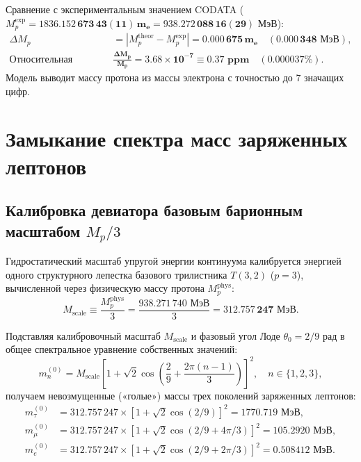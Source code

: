 \documentclass[12pt,a4paper]{article}
\begin{document}
	Сравнение с экспериментальным значением CODATA ($M_p^{\text{exp}} = \mathbf{1836.152\,673\,43(11) \, m_e} = \mathbf{938.272\,088\,16(29) \text{ МэВ}}$):
	\begin{align}
		\Delta M_p &= |M_p^{\text{theor}} - M_p^{\text{exp}}| = \mathbf{0.000\,675 \, m_e} \quad (\mathbf{0.000\,348 \text{ МэВ}}), \\
		\text{Относительная погрешность: } &\mathbf{\frac{\Delta M_p}{M_p} = 3.68 \times 10^{-7} \equiv 0.37 \text{ ppm}} \quad (\mathbf{0.000037\%}).
	\end{align}
	Модель выводит массу протона из массы электрона с точностью до 7 значащих цифр.
	
	\section{Замыкание спектра масс заряженных лептонов}
	
	\subsection{Калибровка девиатора базовым барионным масштабом $M_p/3$}
	Гидростатический масштаб упругой энергии континуума калибруется энергией одного структурного лепестка базового трилистника $T(3,2)$ ($p=3$), вычисленной через физическую массу протона $M_p^{\text{phys}}$:
	\begin{equation}
		M_{\text{scale}} \equiv \frac{M_p^{\text{phys}}}{3} = \frac{938.271\,740 \text{ МэВ}}{3} = \mathbf{312.757\,247 \text{ МэВ}}.
	\end{equation}
	
	Подставляя калибровочный масштаб $M_{\text{scale}}$ и фазовый угол Лоде $\theta_0 = 2/9$ рад в общее спектральное уравнение собственных значений:
	\begin{equation}
		m_n^{(0)} = M_{\text{scale}} \left[ 1 + \sqrt{2} \cos\left( \frac{2}{9} + \frac{2\pi(n-1)}{3} \right) \right]^2, \quad n \in \{1, 2, 3\},
	\end{equation}
	получаем невозмущенные («голые») массы трех поколений заряженных лептонов:
	\begin{align}
		m_\tau^{(0)} &= 312.757\,247 \times \left[ 1 + \sqrt{2} \cos(2/9) \right]^2 = \mathbf{1770.719 \text{ МэВ}}, \\
		m_\mu^{(0)}  &= 312.757\,247 \times \left[ 1 + \sqrt{2} \cos(2/9 + 4\pi/3) \right]^2 = \mathbf{105.2920 \text{ МэВ}}, \\
		m_e^{(0)}    &= 312.757\,247 \times \left[ 1 + \sqrt{2} \cos(2/9 + 2\pi/3) \right]^2 = \mathbf{0.508412 \text{ МэВ}}.
	\end{align}
	
\end{document}
